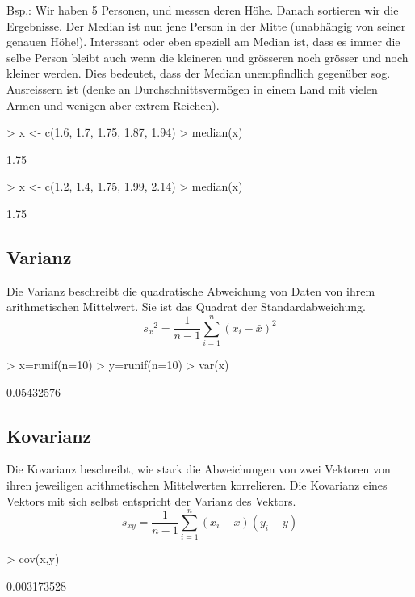 Bsp.: Wir haben 5 Personen, und messen deren Höhe. Danach sortieren wir die
Ergebnisse. Der Median ist nun jene Person in der Mitte (unabhängig von seiner
genauen Höhe!). Interssant oder eben speziell am Median ist,
dass es immer die selbe Person bleibt auch wenn die kleineren und grösseren
noch grösser und noch kleiner werden. Dies bedeutet, dass der Median 
unempfindlich gegenüber sog. Ausreissern ist (denke an Durchschnittsvermögen
in einem Land mit vielen Armen und wenigen aber extrem Reichen).
\begin{Schunk}
\begin{Sinput}
> x <- c(1.6, 1.7, 1.75, 1.87, 1.94)
> median(x)
\end{Sinput}
\begin{Soutput}
[1] 1.75
\end{Soutput}
\begin{Sinput}
> x <- c(1.2, 1.4, 1.75, 1.99, 2.14)
> median(x)
\end{Sinput}
\begin{Soutput}
[1] 1.75
\end{Soutput}
\end{Schunk}

\subsection{Varianz}
Die Varianz beschreibt die quadratische Abweichung von Daten von ihrem 
arithmetischen Mittelwert. Sie ist das Quadrat der Standardabweichung. 
\[ {s_x}^2 = \frac{1}{n-1} \sum\limits_{i=1}^{n} (x_i - \bar{x})^2 \]
\begin{Schunk}
\begin{Sinput}
> x=runif(n=10)
> y=runif(n=10)
> var(x)
\end{Sinput}
\begin{Soutput}
[1] 0.05432576
\end{Soutput}
\end{Schunk}

\subsection{Kovarianz}
Die Kovarianz beschreibt, wie stark die Abweichungen von zwei Vektoren von 
ihren jeweiligen arithmetischen Mittelwerten korrelieren. Die Kovarianz 
eines Vektors mit sich selbst entspricht der Varianz des Vektors. 
\[ s_{xy} 
= \frac{1}{n-1} \sum\limits_{i=1}^{n} (x_i - \bar{x}) (y_i - \bar{y}) \]
\begin{Schunk}
\begin{Sinput}
> cov(x,y)
\end{Sinput}
\begin{Soutput}
[1] 0.003173528
\end{Soutput}
\end{Schunk}


